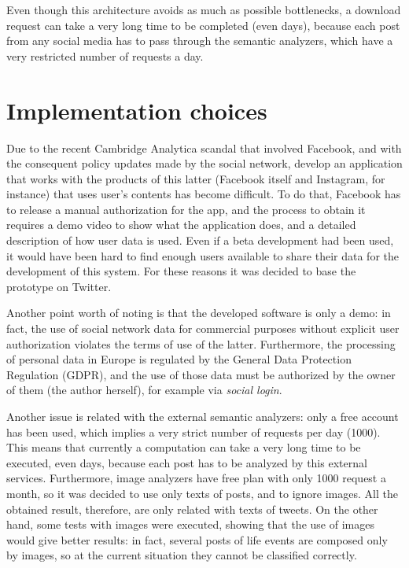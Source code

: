 Even though this architecture avoids as much as possible bottlenecks, a download request can take a very long time to be completed (even days), because each post from any social media has to pass through the semantic analyzers, which have a very restricted number of requests a day.

\section{Implementation choices}
\label{sec:choices}
Due to the recent Cambridge Analytica scandal that involved Facebook, and with the consequent policy updates made by the social network, develop an application that works with the products of this latter (Facebook itself and Instagram, for instance) that uses user's contents has become difficult. To do that, Facebook has to release a manual authorization for the app, and the process to obtain it requires a demo video to show what the application does, and a detailed description of how user data is used. Even if a beta development had been used, it would have been hard to find enough users available to share their data for the development of this system. For these reasons it was decided to base the prototype on Twitter.

Another point worth of noting is that the developed software is only a demo: in fact, the use of social network data for commercial purposes without explicit user authorization violates the terms of use of the latter. Furthermore, the processing of personal data in Europe is regulated by the General Data Protection Regulation (GDPR), and the use of those data must be authorized by the owner of them (the author herself), for example via \emph{social login}.

Another issue is related with the external semantic analyzers: only a free account has been used, which implies a very strict number of requests per day (1000). This means that currently a computation can take a very long time to be executed, even days, because each post has to be analyzed by this external services. Furthermore, image analyzers have free plan with only 1000 request a month, so it was decided to use only texts of posts, and to ignore images. All the obtained result, therefore, are only related with texts of tweets. On the other hand, some tests with images were executed, showing that the use of images would give better results: in fact, several posts of life events are composed only by images, so at the current situation they cannot be classified correctly.

